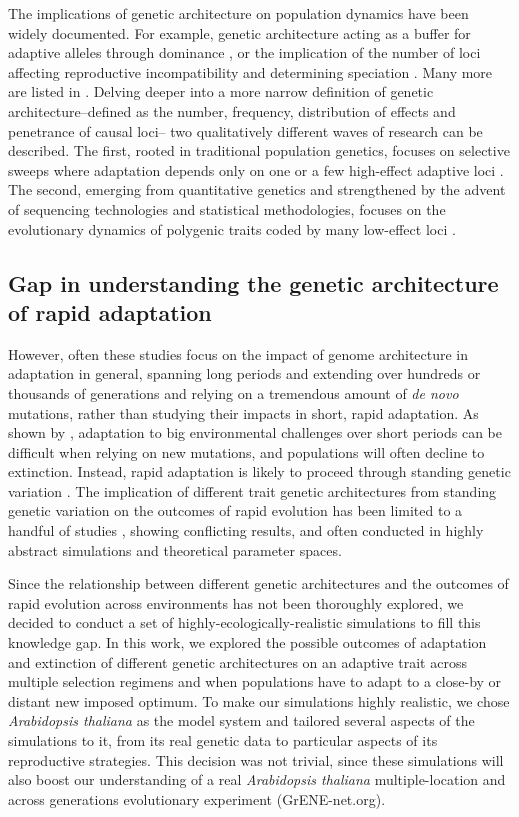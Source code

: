 \documentclass{article}
\begin{document}
The implications of genetic architecture on population dynamics have been widely documented. For example, genetic architecture acting as a buffer for adaptive alleles through dominance \citep{Yamamichi2017-uj}, or the implication of the number of loci affecting reproductive incompatibility and determining speciation \citep{Orr1996-eq}. Many more are listed in \citep{Bertram2019-sg}. Delving deeper into a more narrow definition of genetic architecture--defined as the number, frequency, distribution of effects and penetrance of causal loci-- two qualitatively different waves of research can be described. The first, rooted in traditional population genetics, focuses on selective sweeps where adaptation depends only on one or a few high-effect adaptive loci \citep{Hermisson2005-ii,Barrett2008-tj}. The second, emerging from quantitative genetics and strengthened by the advent of sequencing technologies and statistical methodologies, focuses on the evolutionary dynamics of polygenic traits coded by many low-effect loci \citep{John2020-xc, Jain2017-mb, Barghi2020-aa, Hayward2021-ji, Stetter2018-st, Thornton2019-ww, Hollinger2019-lb}. 

\subsection{Gap in understanding the genetic architecture of rapid adaptation}
However, often these studies focus on the impact of genome architecture in adaptation in general, spanning long periods and extending over hundreds or thousands of generations and relying on a tremendous amount of \textit{de novo} mutations, rather than studying their impacts in short, rapid adaptation. As shown by \citep{Orr2008-jl}, adaptation to big environmental challenges over short periods can be difficult when relying on new mutations, and populations will often decline to extinction. Instead, rapid adaptation is likely to proceed through standing genetic variation \citep{Barrett2008-tj}. The implication of different trait genetic architectures from standing genetic variation on the outcomes of rapid evolution has been limited to a handful of studies \citep{Gomulkiewicz2010-wr, Kardos2021-jd}, showing conflicting results, and often conducted in highly abstract simulations and theoretical parameter spaces.

Since the relationship between different genetic architectures and the outcomes of rapid evolution across environments has not been thoroughly explored, we decided to conduct a set of highly-ecologically-realistic simulations to fill this knowledge gap. In this work, we explored the possible outcomes of adaptation and extinction of different genetic architectures on an adaptive trait across multiple selection regimens and when populations have to adapt to a close-by or distant new imposed optimum. To make our simulations highly realistic, we chose \textit{Arabidopsis thaliana} as the model system and tailored several aspects of the simulations to it, from its real genetic data to particular aspects of its reproductive strategies. This decision was not trivial, since these simulations will also boost our understanding of a real \textit{Arabidopsis thaliana} multiple-location and across generations evolutionary experiment (GrENE-net.org). 
\end{document}
